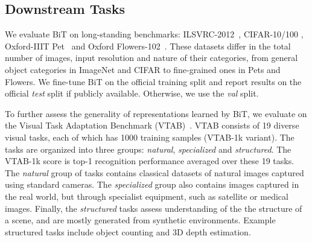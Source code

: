 \documentclass[runningheads]{llncs}
\newcommand{\name}{{BiT}}
\begin{document}
\subsection{Downstream Tasks}

We evaluate \name{} on long-standing benchmarks: ILSVRC-2012~\cite{deng2009imagenet}, CIFAR-10/100 \cite{cifar10}, Oxford-IIIT Pet~\cite{parkhi12a} and Oxford Flowers-102~\cite{Nilsback08}.
These datasets differ in the total number of images, input resolution and nature of their categories, from general object categories in ImageNet and CIFAR to fine-grained ones in Pets and Flowers. 
We fine-tune \name{} on the official training split and report results on the official \emph{test} split if publicly available. Otherwise, we use the \emph{val} split.

To further assess the generality of representations learned by \name{}, we evaluate on the Visual Task Adaptation Benchmark (VTAB)~\cite{zhai2019visual}.
VTAB consists of 19 diverse visual tasks, each of which has 1000 training samples (VTAB-1k variant). The tasks are organized into three groups: \emph{natural}, \emph{specialized} and \emph{structured}. The VTAB-1k score is top-1 recognition performance averaged over these 19 tasks. The \emph{natural} group of tasks contains classical datasets of natural images captured using standard cameras. The \emph{specialized} group also contains images captured in the real world, but through specialist equipment, such as satellite or medical images. Finally, the \emph{structured} tasks assess understanding of the the structure of a scene, and are mostly generated from synthetic environments. Example structured tasks include object counting and 3D depth estimation.
\end{document}
